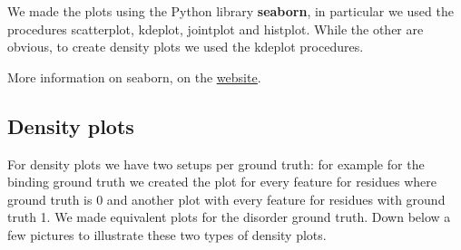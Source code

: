 We made the plots using the Python library \textbf{seaborn}, in particular we used the procedures scatterplot, kdeplot, jointplot and histplot. While the other are obvious, to create density plots we used the kdeplot procedures.

More information on seaborn, on the \href{https://seaborn.pydata.org/}\underline{{website}}.

\subsection{Density plots}
For density plots we have two setups per ground truth: for example for the binding ground truth we created the plot for every feature for residues where ground truth is 0 and another plot with every feature for residues with ground truth 1. We made equivalent plots for the disorder ground truth. Down below a few pictures to illustrate these two types of density plots.

